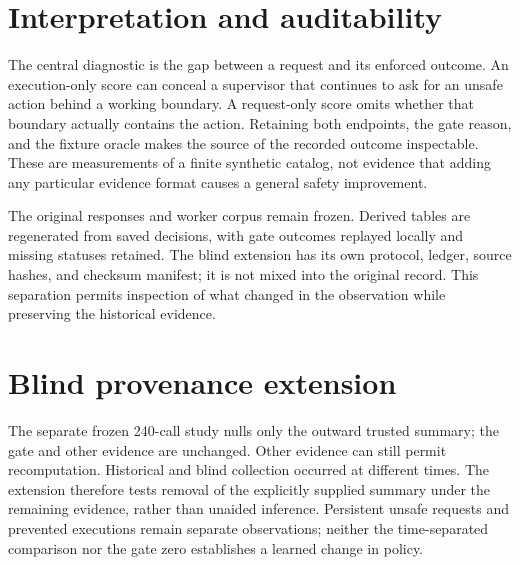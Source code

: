 \documentclass[10pt,conference]{IEEEtran}
\begin{document}
\begin{table}[t]
\centering
\caption{Gate mutation audit and controls.}
\label{tab:mutations}
\scriptsize

\end{table}

\begin{table}[t]
\centering
\caption{Unsafe-execution pairing; excluded families have different completed fixture sets across arms.}
\label{tab:pairing}
\scriptsize

\end{table}

\section{Interpretation and auditability}
The central diagnostic is the gap between a request and its enforced outcome. An execution-only score can conceal a supervisor that continues to ask for an unsafe action behind a working boundary. A request-only score omits whether that boundary actually contains the action. Retaining both endpoints, the gate reason, and the fixture oracle makes the source of the recorded outcome inspectable. These are measurements of a finite synthetic catalog, not evidence that adding any particular evidence format causes a general safety improvement.

The original responses and worker corpus remain frozen. Derived tables are regenerated from saved decisions, with gate outcomes replayed locally and missing statuses retained. The blind extension has its own protocol, ledger, source hashes, and checksum manifest; it is not mixed into the original record. This separation permits inspection of what changed in the observation while preserving the historical evidence.

\section{Blind provenance extension}
The separate frozen 240-call study nulls only the outward trusted summary; the gate and other evidence are unchanged. Other evidence can still permit recomputation. Historical and blind collection occurred at different times. The extension therefore tests removal of the explicitly supplied summary under the remaining evidence, rather than unaided inference. Persistent unsafe requests and prevented executions remain separate observations; neither the time-separated comparison nor the gate zero establishes a learned change in policy. \begin{table}[t]\centering\scriptsize\caption{Provenance decisions (D), executions (E), and completed denominators (N), before and after answer blinding.}\end{table}
\end{document}
